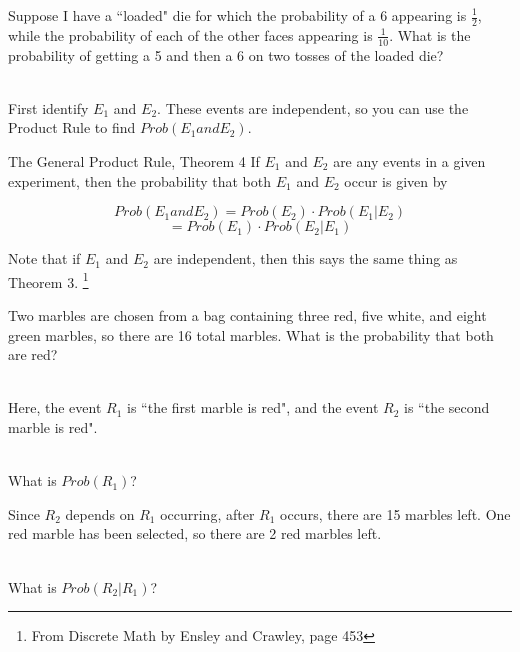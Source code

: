 {    
    \begin{questionNOGRADE}{\thequestion}
        Suppose I have a ``loaded" die for which the probability of a 6
        appearing is $\frac{1}{2}$, while the probability of each of the other faces
        appearing is $\frac{1}{10}$. What is the probability of getting a 5
        and then a 6 on two tosses of the loaded die?

        ~\\
        First identify $E_{1}$ and $E_{2}$. These events are independent,
        so you can use the Product Rule to find $Prob(E_{1} and E_{2})$.
    \end{questionNOGRADE}

    \newpage

        \begin{intro}{The General Product Rule, Theorem 4}
            If $E_{1}$ and $E_{2}$ are any events in a given experiment, then
            the probability that both $E_{1}$ and $E_{2}$ occur is given by

            $$Prob(E_{1} and E_{2}) = Prob(E_{2}) \cdot Prob(E_{1} | E_{2}) $$
            $$ = Prob(E_{1}) \cdot Prob(E_{2} | E_{1}) $$

            Note that if $E_{1}$ and $E_{2}$ are independent, then this says
            the same thing as Theorem 3.
            \footnote{From Discrete Math by Ensley and Crawley, page 453}
        \end{intro}

    \begin{questionNOGRADE}{\thequestion}
        Two marbles are chosen from a bag containing three red, five white, and eight green marbles,
        so there are 16 total marbles.
        What is the probability that both are red?

        ~\\
        Here, the event $R_{1}$ is ``the first marble is red",
        and the event $R_{2}$ is ``the second marble is red".

        ~\\
        What is $Prob(R_{1})$? ~\\ \vspace{1cm}

        Since $R_{2}$ depends on $R_{1}$ occurring, after $R_{1}$
        occurs, there are 15 marbles left. One red marble
        has been selected, so there are 2 red marbles left.

        ~\\
        What is $Prob(R_{2} | R_{1})$? ~\\ \vspace{1cm}


\end{questionNOGRADE}}
